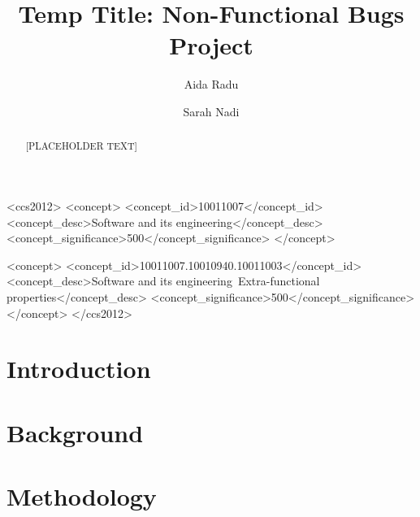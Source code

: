 \documentclass[sigconf]{acmart}
\begin{document}
\title{Temp Title: Non-Functional Bugs Project}

\author{Aida Radu}

\author{Sarah Nadi}


\begin{abstract}
[PLACEHOLDER TEXT]

\end{abstract}


\begin{CCSXML}
	<ccs2012>
	<concept>
	<concept_id>10011007</concept_id>
	<concept_desc>Software and its engineering</concept_desc>
	<concept_significance>500</concept_significance>
	</concept>
    
	<concept>
	<concept_id>10011007.10010940.10011003</concept_id>
	<concept_desc>Software and its engineering~Extra-functional properties</concept_desc>
	<concept_significance>500</concept_significance>
	</concept>
	</ccs2012>
\end{CCSXML}





\maketitle

\section{Introduction}
\section{Background}
\section{Methodology}
\end{document}
